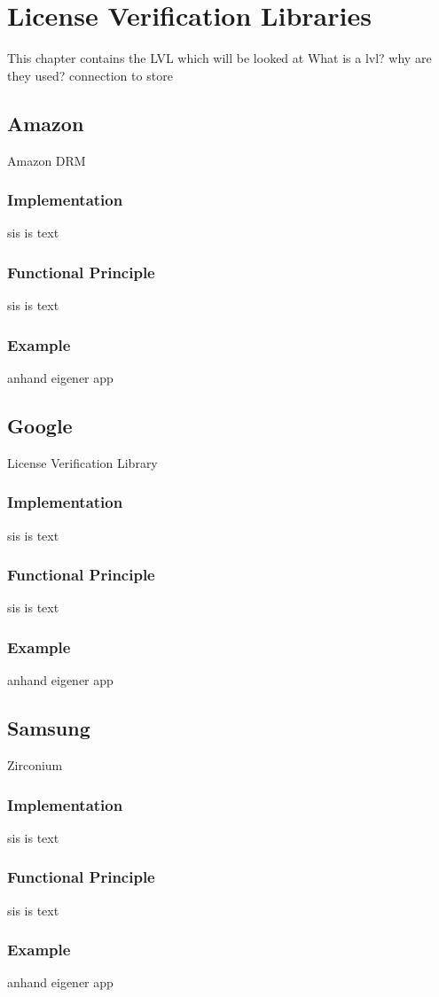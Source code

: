 \section{License Verification Libraries}\label{section:lvl}
This chapter contains the LVL which will be looked at\newline
What is a lvl? why are they used? connection to store
\subsection{Amazon}\label{subsection:lvl-amazon}
Amazon DRM
\subsubsection{Implementation}\label{subsection:lvl-amazon-implementation}
sis is text
\subsubsection{Functional Principle}\label{subsection:lvl-amazon-functional}
sis is text
\subsubsection{Example}\label{subsection:lvl-amazon-example}
anhand eigener app
\subsection{Google}\label{subsection:lvl-google}
License Verification Library
\subsubsection{Implementation}\label{subsection:lvl-google-implementation}
sis is text
\subsubsection{Functional Principle}\label{subsection:lvl-google-functional}
sis is text
\subsubsection{Example}\label{subsection:lvl-google-example}
anhand eigener app
\subsection{Samsung}\label{subsection:lvl-samsung}
Zirconium
\subsubsection{Implementation}\label{subsection:lvl-samsung-implementation}
sis is text
\subsubsection{Functional Principle}\label{subsection:lvl-samsung-functional}
sis is text
\subsubsection{Example}\label{subsection:lvl-samsung-example}
anhand eigener app
